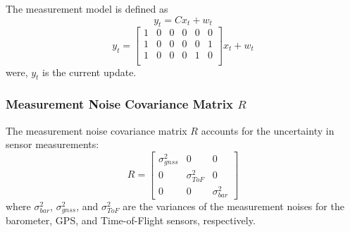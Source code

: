 \documentclass{report}
\begin{document}
    The measurement model is defined as
    \begin{equation}
    y_t = C x_t + w_t
    \end{equation}
    \begin{equation}
        y_t  = 
        \begin{bmatrix}
            1 & 0 & 0 & 0 & 0 & 0 \\
            1 & 0 & 0 & 0 & 0 & 1 \\
            1 & 0 & 0 & 0 & 1 & 0 \\
        \end{bmatrix}
            x_t + w_t
    \end{equation}
    were, \(y_t\) is the current update.

    \subsubsection*{Measurement Noise Covariance Matrix \( R \)}
    The measurement noise covariance matrix \( R \) accounts for the uncertainty
    in sensor measurements:
    \begin{equation}
    R = 
    \begin{bmatrix}
    \sigma_{gnss}^2 & 0 & 0 \\
    0 & \sigma_{ToF}^2 & 0 \\
    0 & 0 & \sigma_{bar}^2
    \end{bmatrix}
    \end{equation}
    where \( \sigma_{bar}^2 \), \( \sigma_{gnss}^2 \), and \( \sigma_{ToF}^2 \)
    are the variances of the measurement noises for the barometer, GPS, and
    Time-of-Flight sensors, respectively.
\end{document}
